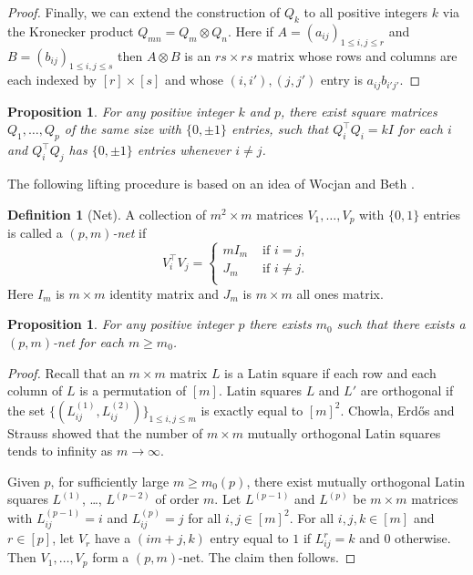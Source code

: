 \documentclass[reqno, 11pt]{amsart}
\newtheorem{proposition}[theorem]{Proposition}
\theoremstyle{definition}
\newtheorem{definition}[theorem]{Definition}
\theoremstyle{remark}
\begin{document}
\begin{proof}
        Finally, we can extend the construction of $Q_k$ to all positive integers $k$ via the Kronecker product $Q_{mn} = Q_m \otimes Q_n$. Here if $A=(a_{ij})_{1 \leq i, j \leq r}$ and $B=(b_{ij})_{1 \leq i,j\leq s}$ then $A \otimes B$ is an $rs \times rs$ matrix whose rows and columns are each indexed by $[r] \times [s]$ and whose $(i,i'),(j,j')$ entry is $a_{ij}b_{i'j'}$.
\end{proof}

\begin{proposition}\label{prop:matrix-copies}
    For any positive integer $k$ and $p$, there exist square matrices $Q_1, \ldots, Q_p$ of the same size with $\{0, \pm 1\}$ entries, such that $Q_i^\intercal Q_i = k I$ for each $i$ and $Q_i^\intercal Q_j$ has $\{0, \pm 1\}$ entries whenever $i \neq j$.
\end{proposition}


The following lifting procedure is based on an idea of Wocjan and Beth \cite{WB05}. 

\begin{definition}[Net]\label{def:net}
A collection of $m^2 \times m$ matrices $V_1, \ldots, V_p$ with  $\{0,1\}$ entries is called a \emph{$(p,m)$-net} if
\[
    V_i^\intercal V_j = \begin{cases}
                            m I_m & \text{ if } i = j, \\
                            J_m   & \text{ if } i \neq j. \\
                         \end{cases}
\]
Here $I_m$ is $m\times m$ identity matrix and $J_m$ is $m\times m$ all ones matrix.
\end{definition}

\begin{proposition}\label{porp:net}
    For any positive integer $p$ there exists $m_0$ such that there exists a $(p,m)$-net for each $m \geq m_0$.
\end{proposition}
\begin{proof}
Recall that an $m \times m$ matrix $L$ is a Latin square if each row and each column of $L$ is a permutation of $[m]$. Latin squares $L$ and $L'$ are orthogonal if the set $\{{(L^{(1)}_{ij}, L^{(2)}_{ij})}\}_{1 \leq i, j \leq m}$ is exactly equal to $[m]^2$. 
Chowla, Erd\H{o}s and Strauss \cite{CES60} showed that the number of $m \times m$ mutually orthogonal Latin squares tends to infinity as $m \to \infty$.

Given $p$, for sufficiently large $m \ge m_0(p)$, there exist mutually orthogonal Latin squares $L^{(1)}$, \dots, $L^{(p-2)}$ of order $m$. 
Let $L^{(p-1)}$ and $L^{(p)}$ be $m \times m$ matrices with $L^{(p-1)}_{ij} = i$ and $L^{(p)}_{ij} = j$ for all $i,j \in [m]^2$. 
For all $i, j, k \in [m]$ and $r \in [p]$, let $V_r$ have a $(im + j, k)$ entry equal to $1$ if $L^{r}_{ij} = k$ and $0$ otherwise. 
Then $V_1, \ldots, V_p$ form a $(p, m)$-net. The claim then follows.
\end{proof}
\end{document}
